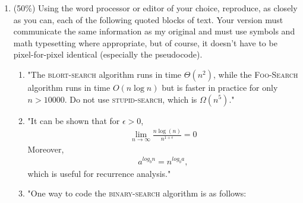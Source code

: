 \documentclass[11pt]{article}
\begin{document}
\begin{enumerate}
\item (50\%) Using the word processor or editor of your choice, reproduce, as closely as you can, each of the
following quoted blocks of text. Your version must communicate the same information as my original
and must use symbols and math typesetting where appropriate, but of course, it doesn’t have to be
pixel-for-pixel identical (especially the pseudocode).
\begin{enumerate} 
\item "The \textsc{blort-search} algorithm runs in time $\Theta(n^2)$, while the \textsc{Foo-Search} algorithm runs in time $O(n\log n)$ but is faster in practice for only $n > 10000$.  Do not use \textsc{stupid-search}, which is $\Omega(n^5)$."
\item
"It can be shown that for $\epsilon>0$,
\begin{align*}
\lim_{n\to\infty}\frac{n\log (n)}{n^{1+\epsilon}}=0
\end{align*}
Moreover,
\begin{align*}
a^{log_b n}=n^{log_b a},
\end{align*}
which is useful for recurrence analysis."
\item "One way to code the \textsc{binary-search} algorithm is as follows:
\end{enumerate}
\end{enumerate}
\end{document}
